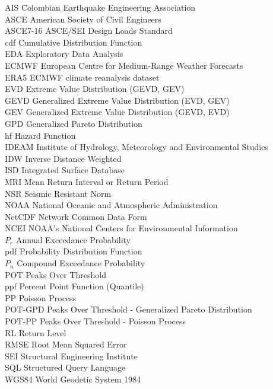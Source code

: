 \documentclass[12pt,oneside]{reedthesis}
\begin{document}
  \begin{dedication}
    \begin{tabbing}
    AIS \hspace{3em} \= Colombian Earthquake Engineering Association  \\
    ASCE \> American Society of Civil Engineers \\
    ASCE7-16 \> ASCE/SEI Design Loads Standard \\
    cdf \>  Cumulative Distribution Function \\
    EDA \>  Exploratory Data Analysis \\
    ECMWF \>  European Centre for Medium-Range Weather Forecasts \\
    ERA5 \>  ECMWF climate reanalysis dataset  \\
    EVD \>  Extreme Value Distribution (GEVD, GEV)  \\
    GEVD \>  Generalized Extreme Value Distribution (EVD, GEV) \\
    GEV \>  Generalized Extreme Value Distribution (GEVD, EVD)  \\
    GPD \>  Generalized Pareto Distribution  \\
    hf \> Hazard Function \\
    IDEAM \> Institute of Hydrology, Meteorology and Environmental Studies \\
    IDW \>  Inverse Distance Weighted \\
    ISD \> Integrated Surface Database \\
    MRI \> Mean Return Interval or Return Period \\
    NSR \> Seismic Resistant Norm  \\
    NOAA \> National Oceanic and Atmospheric Administration \\
    NetCDF \> Network Common Data Form \\
    NCEI \> NOAA's National Centers for Environmental Information \\
    $P_e$ \> Annual Exceedance Probability \\
    pdf \> Probability Distribution Function  \\
    $P_n$ \>  Compound Exceedance Probability \\
    POT \> Peaks Over Threshold \\
    ppf \> Percent Point Function (Quantile) \\
    PP \> Poisson Process \\
    POT-GPD \> Peaks Over Threshold - Generalized Pareto Distribution \\
    POT-PP  \> Peaks Over Threshold - Poisson Process \\
    RL \> Return Level \\
    RMSE \> Root Mean Squared Error \\  
    SEI \> Structural Engineering Institute \\
    SQL \>  Structured Query Language \\
    WGS84 \> World Geodetic System 1984
    \end{tabbing}
  \end{dedication}
\mainmatter %
\pagestyle{fancyplain} %
\end{document}
